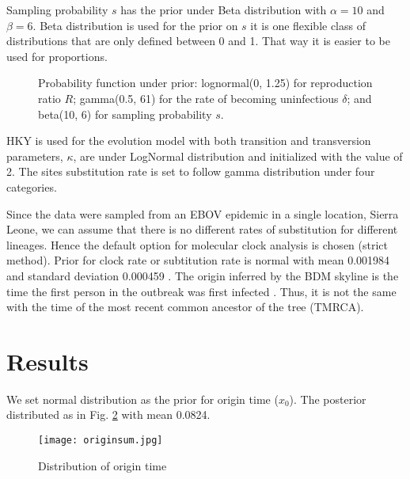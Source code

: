 \documentclass[11pt]{paper}
\begin{document}
	Sampling probability $s$ has the prior under Beta distribution with $\alpha = 10$ and $\beta = 6$.
	Beta distribution is used for the prior on $s$ it is one flexible class of distributions that are only defined between 0 and 1. That way it is easier to be used for proportions.
	
	\begin{figure}[!htbp]%
		\centering
		\hspace{5pt}%
		\hspace{5pt}%
		\caption[A set of three subfigures.]{Probability function under prior:
			 lognormal(0, 1.25) for reproduction ratio $R$;
			 gamma(0.5, 61) for the rate of becoming uninfectious $\delta$; and
			 beta(10, 6) for sampling probability $s$.}
		\label{fig:priors}%
	\end{figure}
	
	
	HKY \cite{Hasegawa1985} is used for the evolution model with both transition and transversion parameters, $\kappa$, are under LogNormal distribution and initialized with the value of 2. 
	The sites substitution rate is set to follow gamma distribution under four categories.
	
	Since the data were sampled from an EBOV epidemic in a single location, Sierra Leone, we can assume that there is no different rates of substitution for different lineages. Hence the default option for molecular clock analysis is chosen (strict method).
	Prior for clock rate or subtitution rate is normal with mean 0.001984 and standard deviation 0.000459 \cite{Stadler2014, Gire2014}. 
	The origin inferred by the BDM skyline is the time the first person in the outbreak was first infected \cite{Stadler2014}.  Thus, it is not the same with the time of the most recent common ancestor of the tree (TMRCA).

\section*{Results}
	
	We set normal distribution as the prior for origin time ($x_0$). The posterior distributed as in Fig. \ref{fig:origin} with mean 0.0824. 
	
	\begin{figure}[!htbp]
		\label{fig:origin}
		\centering
		\texttt{[image: originsum.jpg]}
		\caption{Distribution of origin time}
	\end{figure}
	
\end{document}
